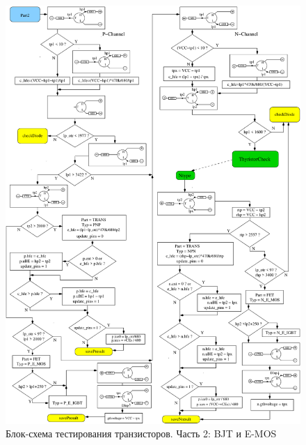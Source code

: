 \begin{figure}[H]
\centering
\includegraphics[width=.95\textwidth]{../FIG/CheckSemi2.pdf}
\caption{Блок-схема тестирования транзисторов. Часть 2: BJT и E-MOS}
\label{fig:ChkSemi2}
\end{figure}


